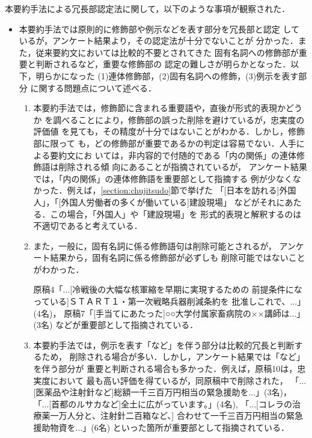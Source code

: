 本要約手法による冗長部認定法に関して，以下のような事項が観察された．
\begin{itemize}
 \item 本要約手法では原則的に修飾部や例示などを表す部分を冗長部と認定
       しているが，アンケート結果より，その認定法が十分でないことが
       分かった．また，従来要約文においては比較的不要とされてきた
       固有名詞への修飾部が重要と判断されるなど，重要な修飾部の
       認定の難しさが明らかとなった．以下，明らかになった
       (1)連体修飾部，(2)固有名詞への修飾，(3)例示を表す部分
       に関する問題点について述べる．

       \begin{enumerate}
 
	\item 

       本要約手法では，修飾節に含まれる重要語や，直後が形式的表現かどうか
       を調べることにより，修飾部の誤った削除を避けているが，忠実度の評価値
       を見ても，その精度が十分ではないことがわかる．しかし，修飾部に限って
       も，どの修飾部が重要であるかの判定は容易でない．人手による要約文にお
       いては，非内容的で付随的である「内の関係」の連体修飾語は削除される傾
       向にあることが指摘されているが\cite{youyaku_ruikei}，
       アンケート結果では，「内の関係」の連体修飾語を重要部として指摘する
       例が少なくなかった．例えば，\ref{section:chujitsudo}節で挙げた
       「[日本を訪れる]外国人」，「[外国人労働者の多くが働いている]建設現場」
       などがそれにあたる．この場合，「外国人」や「建設現場」を
       形式的表現と解釈するのは不適切であると考えている．

	\item 

       また，一般に，固有名詞に係る修飾語句は削除可能とされるが，
       アンケート結果から，固有名詞に係る修飾部が必ずしも
       削除可能ではないことがわかった．

       原稿4「...[冷戦後の大幅な核軍縮を早期に実現するための
       前提条件になっている]ＳＴＡＲＴ１・第一次戦略兵器削減条約を
       批准しこれで、...」(4名)，
       原稿7「[手当てにあたった]○○大学付属家畜病院の××講師は...」(3名)
       などが重要部として指摘されている．

	\item 

       本要約手法では，例示を表す「など」を伴う部分は比較的冗長と判断するため，
       削除される場合が多い．しかし，アンケート結果では「など」を伴う部分が
       重要と判断される場合も多かった．例えば，原稿10は，忠実度において
       最も高い評価を得ているが，同原稿中で削除された，
       「...[医薬品や注射針など]総額一千三百万円相当の緊急援助を...」(3名)，
       「...[首都のルサカなど]全土に広がっています。」(4名),
       「...[コレラの治療薬一万人分と、注射針二百箱など、]
       合わせて一千三百万円相当の緊急援助物資を...」(6名)
       といった箇所が重要部として指摘されている．


\end{enumerate}
\end{itemize}
